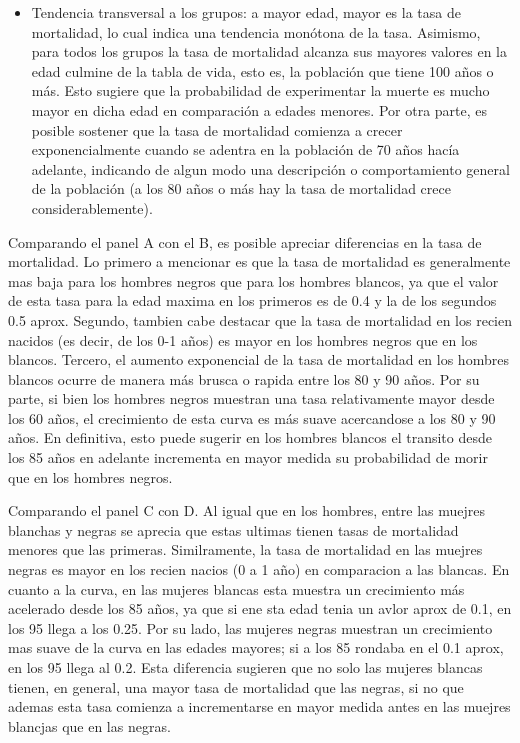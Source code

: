 \documentclass[
  12pt,
]{article}
\providecommand{\tightlist}{%
  \setlength{\itemsep}{0pt}\setlength{\parskip}{0pt}}
\begin{document}
\begin{itemize}
\tightlist
\item
  Tendencia transversal a los grupos: a mayor edad, mayor es la tasa de
  mortalidad, lo cual indica una tendencia monótona de la tasa.
  Asimismo, para todos los grupos la tasa de mortalidad alcanza sus
  mayores valores en la edad culmine de la tabla de vida, esto es, la
  población que tiene 100 años o más. Esto sugiere que la probabilidad
  de experimentar la muerte es mucho mayor en dicha edad en comparación
  a edades menores. Por otra parte, es posible sostener que la tasa de
  mortalidad comienza a crecer exponencialmente cuando se adentra en la
  población de 70 años hacía adelante, indicando de algun modo una
  descripción o comportamiento general de la población (a los 80 años o
  más hay la tasa de mortalidad crece considerablemente).
\end{itemize}

Comparando el panel A con el B, es posible apreciar diferencias en la
tasa de mortalidad. Lo primero a mencionar es que la tasa de mortalidad
es generalmente mas baja para los hombres negros que para los hombres
blancos, ya que el valor de esta tasa para la edad maxima en los
primeros es de 0.4 y la de los segundos 0.5 aprox. Segundo, tambien cabe
destacar que la tasa de mortalidad en los recien nacidos (es decir, de
los 0-1 años) es mayor en los hombres negros que en los blancos.
Tercero, el aumento exponencial de la tasa de mortalidad en los hombres
blancos ocurre de manera más brusca o rapida entre los 80 y 90 años. Por
su parte, si bien los hombres negros muestran una tasa relativamente
mayor desde los 60 años, el crecimiento de esta curva es más suave
acercandose a los 80 y 90 años. En definitiva, esto puede sugerir en los
hombres blancos el transito desde los 85 años en adelante incrementa en
mayor medida su probabilidad de morir que en los hombres negros.

Comparando el panel C con D. Al igual que en los hombres, entre las
muejres blanchas y negras se aprecia que estas ultimas tienen tasas de
mortalidad menores que las primeras. Similramente, la tasa de mortalidad
en las muejres negras es mayor en los recien nacios (0 a 1 año) en
comparacion a las blancas. En cuanto a la curva, en las mujeres blancas
esta muestra un crecimiento más acelerado desde los 85 años, ya que si
ene sta edad tenia un avlor aprox de 0.1, en los 95 llega a los 0.25.
Por su lado, las mujeres negras muestran un crecimiento mas suave de la
curva en las edades mayores; si a los 85 rondaba en el 0.1 aprox, en los
95 llega al 0.2. Esta diferencia sugieren que no solo las mujeres
blancas tienen, en general, una mayor tasa de mortalidad que las negras,
si no que ademas esta tasa comienza a incrementarse en mayor medida
antes en las muejres blancjas que en las negras.
\end{document}
